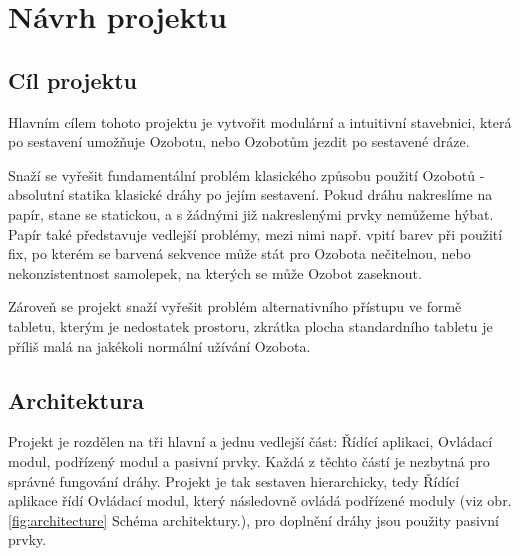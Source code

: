 \chapter{Návrh projektu}
    \section{Cíl projektu}
    Hlavním cílem tohoto projektu je vytvořit modulární a intuitivní stavebnici, která po sestavení umožňuje Ozobotu, nebo Ozobotům jezdit po sestavené dráze.
    
    Snaží se vyřešit fundamentální problém klasického způsobu použití Ozobotů - absolutní statika klasické dráhy po jejím sestavení. Pokud dráhu nakreslíme na papír, stane se statickou, a s žádnými již nakreslenými prvky nemůžeme hýbat. Papír také představuje vedlejší problémy, mezi nimi např. vpití barev při použití fix, po kterém se barvená sekvence může stát pro Ozobota nečitelnou, nebo nekonzistentnost samolepek, na kterých se může Ozobot zaseknout. 
    
    Zároveň se projekt snaží vyřešit problém alternativního přístupu ve formě tabletu, kterým je nedostatek prostoru, zkrátka plocha standardního tabletu je příliš malá na jakékoli normální užívání Ozobota. 
    \section{Architektura}
    Projekt je rozdělen na tři hlavní a jednu vedlejší část: Řídící aplikaci, Ovládací modul, podřízený modul a pasivní prvky.  Každá z těchto částí je nezbytná pro správné fungování dráhy. Projekt je tak sestaven hierarchicky, tedy Řídící aplikace řídí Ovládací modul, který následovně ovládá podřízené moduly (viz obr. \ref{fig:architecture} Schéma architektury.), pro doplnění dráhy jsou použity pasivní prvky.

